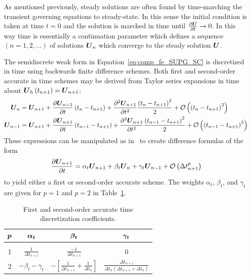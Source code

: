 As mentioned previously, steady solutions are often found by time-marching the transient governing equations to steady-state.  In this sense the initial condition is taken at time $t=0$ and the solution is marched in time until ${\frac{\partial{{\boldsymbol{U}}}}{\partial{t}}}\rightarrow 0$.  In this way time is essentially a continuation parameter which defines a sequence $(n=1,2,\ldots)$ of solutions ${\boldsymbol{U}}_n$ which converge to the steady solution ${\boldsymbol{U}}$. 

The semidiscrete weak form in Equation~\eqref{eq:comp_fe_SUPG_SC} is discretized in time using backwards finite difference schemes.  Both first and second-order accurate in time schemes may be derived from Taylor series expansions in time about ${\boldsymbol{U}}_h\left(t_{n+1}\right)={\boldsymbol{U}}_{n+1}$:
\begin{align}
  {\boldsymbol{U}}_n     = {\boldsymbol{U}}_{n+1} &+ {\frac{\partial{{\boldsymbol{U}}_{n+1}}}{\partial{t}}}\left(t_n-t_{n+1}\right) + {\frac{{\partial}^2{{\boldsymbol{U}}_{n+1}}}{\partial{t}^2}}\frac{\left(t_n-t_{n+1}\right)^2}{2} + \mathcal{O}\left(\left(t_n-t_{n+1}\right)^3\right) \nonumber \\
  {\boldsymbol{U}}_{n-1} = {\boldsymbol{U}}_{n+1} &+ {\frac{\partial{{\boldsymbol{U}}_{n+1}}}{\partial{t}}}\left(t_{n-1}-t_{n+1}\right) + {\frac{{\partial}^2{{\boldsymbol{U}}_{n+1}}}{\partial{t}^2}}\frac{\left(t_{n-1}-t_{n+1}\right)^2}{2} + \mathcal{O}\left(\left(t_{n-1}-t_{n+1}\right)^3\right) \nonumber
\end{align}
These expressions can be manipulated as in~\cite{benkirk_dissertation,fins_ijnmf} to create difference formulas of the form
\begin{equation}
  {\frac{\partial{{\boldsymbol{U}}_{n+1}}}{\partial{t}}} = \alpha_t {\boldsymbol{U}}_{n+1} + \beta_t {\boldsymbol{U}}_n + \gamma_t {\boldsymbol{U}}_{n-1} + \mathcal{O}\left(\Delta t_{n+1}^p\right)
  \label{eq:udot_thee_pt_backward}
\end{equation}
to yield either a first or second-order accurate scheme.  The weights $\alpha_t$, $\beta_t$, and $\gamma_t$ are given for $p=1$ and $p=2$ in Table~\ref{table:udot_weights}.
\begin{table}[hbtp]
  \begin{center}
    \caption{First and second-order accurate time discretization coefficients.\label{table:udot_weights}}
    \vspace{.2em}
    \begin{tabular}{c||ccc}
      ${\boldsymbol{p}}$ & ${\boldsymbol{\alpha_t}}$ & ${\boldsymbol{\beta_t}}$ & ${\boldsymbol{\gamma_t}}$ \\ \hline\hline
           &          &         & \\
       1  & $\frac{1}{\Delta t_{n+1}}$ & $\frac{-1}{\Delta t_{n+1}}$ & 0 \\
       2  & $-\beta_t - \gamma_t$ 
          & $-\left[\frac{1}{\Delta t_{n+1}} + \frac{1}{\Delta t_n}\right]$
          & $\frac{\Delta t_{n+1}}{\Delta t_n\left(\Delta t_{n+1} + \Delta t_n\right)}$ 
    \end{tabular}
  \end{center}
\end{table}

